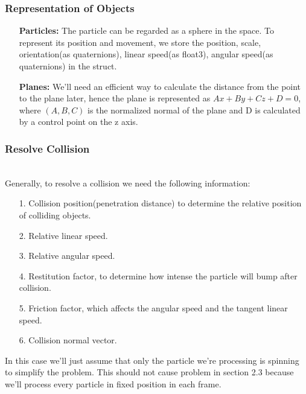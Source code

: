 \documentclass[acmtog]{acmart}
\begin{document}
\subsubsection{Representation of Objects}
\begin{enumerate}
	\item[] \textbf{Particles:} The particle can be regarded as a sphere in the space. To represent its position and movement, we store the position, scale, orientation(as quaternions), linear speed(as float3), angular speed(as quaternions) in the struct.
	\item[]  \textbf{Planes:} We'll need an efficient way to calculate the distance from the point to the plane later, hence the plane is represented as $Ax+ By+Cz+D = 0$, where $(A,B,C)$ is the normalized normal of the plane and D is calculated by a control point on the z axis.
\end{enumerate}
\subsubsection{Resolve Collision}
\quad \\
Generally, to resolve a collision we need the following information:
\begin{enumerate}
	\item [1.] Collision position(penetration distance) to determine the relative position of colliding objects.
	\item [2.] Relative linear speed.
	\item [3.] Relative angular speed. 
	\item [4.] Restitution factor, to determine how intense the particle will bump after collision.
	\item [5.] Friction factor, which affects the angular speed and the tangent linear speed.
	\item [6.] Collision normal vector.
\end{enumerate}
In this case we'll just assume that only the particle we're processing is spinning to simplify the problem. This should not cause problem in section 2.3 because we'll process every particle in fixed position in each frame.\\
\quad\\
\end{document}
